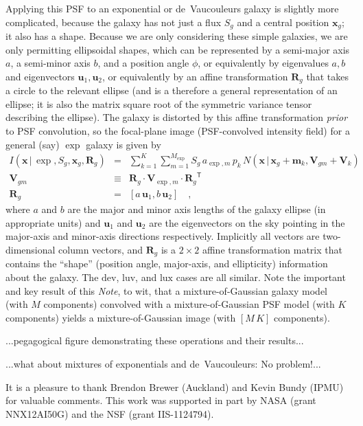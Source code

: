 \documentclass[12pt,pdftex,preprint]{aastex}
\newcommand{\documentname}{\textsl{Note}}
\newcommand{\tmatrix}[1]{\boldsymbol{#1}}
\newcommand{\transpose}[1]{{#1}^{\mathsf T}}
\newcommand{\tvector}[1]{\boldsymbol{#1}}
\newcommand{\pos}{\tvector{x}}
\newcommand{\mean}{\tvector{m}}
\newcommand{\var}{\tmatrix{V}\!}
\newcommand{\affine}{\tmatrix{R}}
\newcommand{\uv}{\tvector{u}}
\newcommand{\normal}{N}
\newcommand{\given}{\,|\,}
\newcommand{\dev}{\mathrm{dev}}
\newcommand{\lux}{\mathrm{lux}}
\newcommand{\luv}{\mathrm{luv}}
\begin{document}
Applying this PSF to an exponential or de~Vaucouleurs galaxy is
slightly more complicated, because the galaxy has not just a flux
$S_g$ and a central position $\pos_g$; it also has a shape.  Because
we are only considering these simple galaxies, we are only permitting
ellipsoidal shapes, which can be represented by a semi-major axis $a$,
a semi-minor axis $b$, and a position angle $\phi$, or equivalently by
eigenvalues $a, b$ and eigenvectors $\uv_1, \uv_2$, or equivalently by
an affine transformation $\affine_g$ that takes a circle to the
relevant ellipse (and is a therefore a general representation of an
ellipse; it is also the matrix square root of the symmetric variance
tensor describing the ellipse).  The galaxy is distorted by this
affine transformation \emph{prior} to PSF convolution, so the
focal-plane image (PSF-convolved intensity field) for a general (say)
$\exp$ galaxy is given by
\begin{eqnarray}\displaystyle
I(\pos\given\exp,S_g,\pos_g,\affine_g) &=& \sum_{k=1}^K \sum_{m=1}^{M_{\exp}} S_g\,a_{\exp,m}\,p_k\,\normal(\pos\given\pos_g+\mean_k,\var_{gm}+\var_k)
\\
\var_{gm} &\equiv& \affine_g\cdot\var_{\exp,m}\cdot\transpose{\affine_g}
\\
\affine_g &=& \left[a\,\uv_1 , b\,\uv_2 \right]
\quad ,
\end{eqnarray}
where $a$ and $b$ are the major and minor axis lengths of the galaxy
ellipse (in appropriate units) and $\uv_1$ and $\uv_2$ are the
eigenvectors on the sky pointing in the major-axis and minor-axis
directions respectively.  Implicitly all vectors are two-dimensional
column vectors, and $\affine_g$ is a $2\times 2$ affine transformation
matrix that contains the ``shape'' (position angle, major-axis, and
ellipticity) information about the galaxy.  The $\dev$, $\luv$, and
$\lux$ cases are all similar.  Note the important and key result of
this \documentname, to wit, that a mixture-of-Gaussian galaxy model
(with $M$ components) convolved with a mixture-of-Gaussian PSF model
(with $K$ components) yields a mixture-of-Gaussian image (with
$[M\,K]$ components).

...pegagogical figure demonstrating these operations and their results...

...what about mixtures of exponentials and de~Vaucouleurs:  No problem!...

\acknowledgements It is a pleasure to thank Brendon Brewer (Auckland)
and Kevin Bundy (IPMU) for valuable comments.  This work was supported
in part by NASA (grant NNX12AI50G) and the NSF (grant IIS-1124794).
\end{document}
